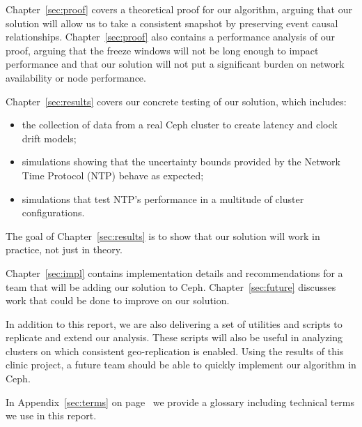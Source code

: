 Chapter~\ref{sec:proof} covers a theoretical proof for our algorithm, arguing
that our solution will allow us to take a consistent snapshot by preserving 
event causal relationships. Chapter~\ref{sec:proof} also contains a 
performance analysis of our proof, arguing that the freeze windows will not be 
long enough to impact performance and that our solution will not put a 
significant burden on network availability or node performance. 

Chapter~\ref{sec:results} covers our concrete testing of our solution, which
includes:
\begin{itemize}
\item the collection of data from a real Ceph cluster to create latency and
clock drift models;
\item simulations showing that the uncertainty bounds provided by the Network 
Time Protocol (NTP) behave as expected;
\item simulations that test NTP's performance in a multitude of cluster
configurations.
\end{itemize}
The goal of Chapter~\ref{sec:results} is to show that our solution will work
in practice, not just in theory.

Chapter~\ref{sec:impl} contains implementation details and recommendations for
a team that will be adding our solution to Ceph. Chapter~\ref{sec:future} 
discusses work that could be done to improve on our solution.

In addition to this report, we are also delivering a set of utilities
and scripts to replicate and extend our analysis. These scripts will
also be useful in analyzing clusters on which consistent
geo-replication is enabled. Using the results of this clinic project,
a future team should be able to quickly implement our algorithm in
Ceph.

In Appendix~\ref{sec:terms} on page~\pageref{sec:terms} we provide
a glossary including technical terms we use in this report.


